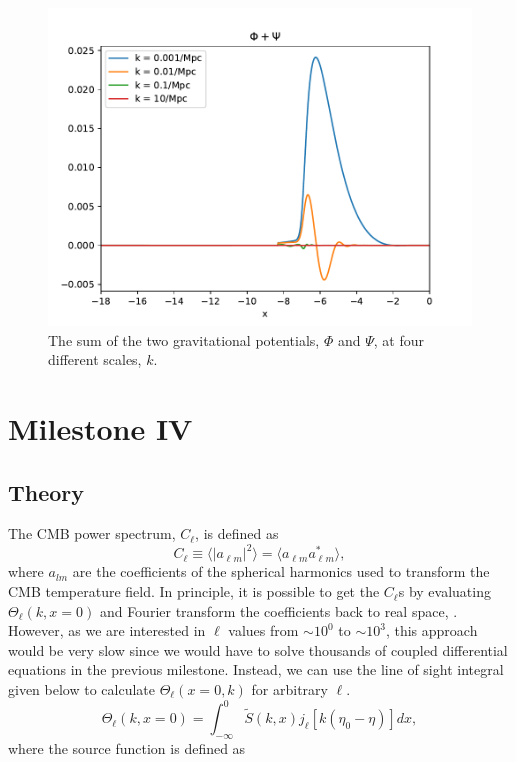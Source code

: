 \documentclass{aa}
\begin{document}
\begin{figure}[H]
   \includegraphics[scale=0.6]{../figures/milestone3/phi_psi.pdf}
   \caption{The sum of the two gravitational potentials, $\Phi$ and $\Psi$, at four different scales, $k$.}\label{fig:phi_psi}
\end{figure}



\section{Milestone IV}

\subsection{Theory}
The CMB power spectrum, $C_\ell$, is defined as 
\begin{equation}
   C_\ell \equiv \langle |a_{\ell m}|^2 \rangle = \langle a_{\ell m}a_{\ell m}^* \rangle,
\end{equation}
where $a_{lm}$ are the coefficients of the spherical harmonics used to transform the CMB temperature field. In principle, it is possible to get the $C_\ell$s by evaluating $\Theta_\ell(k,x=0)$
and Fourier transform the coefficients back to real space, \cite{winther:2023}. However, as we are interested in $\ell$ values from $\sim 10^0$ to $\sim 10^3$, this approach would 
be very slow since we would have to solve thousands of coupled differential equations in the previous milestone. Instead, we can use the line of sight integral given below to calculate $\Theta_\ell(x=0,k)$ for arbitrary $\ell$.
\begin{equation}
   \Theta_\ell(k, x=0) = \int_{-\infty}^{0} \tilde{S}(k,x) j_\ell[k(\eta_0-\eta)] dx,
\end{equation}
where the source function is defined as 
\end{document}
